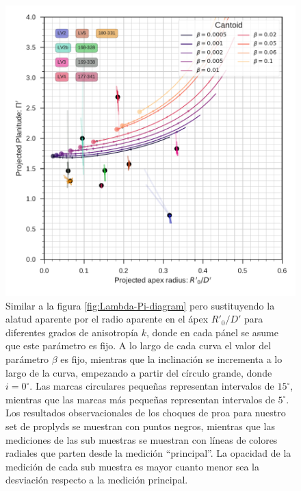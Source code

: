 \begin{figure}
  \centering
 \includegraphics[width=0.9\linewidth]{./Figures/obs-diagnostic-Pi-R0-Cantoid}  
  \caption{Similar a la figura \ref{fig:Lambda-Pi-diagram} pero sustituyendo la alatud aparente por el radio aparente en el ápex $R'_0/D'$ para diferentes grados de anisotropía $k$, donde en cada pánel se asume que este parámetro es fijo. A lo largo de cada curva el valor del parámetro $\beta$ es fijo,  mientras que la inclinación se incrementa a lo largo de la curva, empezando a partir del círculo grande, donde $i=0^\circ$. Las marcas circulares pequeñas representan intervalos de $15^\circ$, mientras que las marcas más pequeñas representan intervalos de $5^\circ$. Los resultados observacionales de los choques de proa para nuestro set de proplyds se muestran con puntos negros, mientras que las mediciones de las sub muestras se muestran con líneas de colores radiales que parten desde la medición ``principal''. La opacidad de la medición de cada sub muestra es mayor cuanto menor sea la desviación respecto a la medición principal.}
  \label{fig:obs-diagnostic}
\end{figure}

